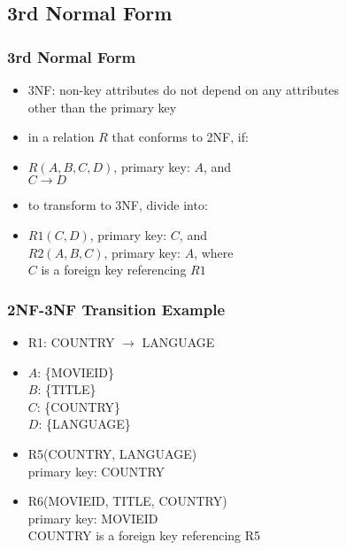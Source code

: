 \documentclass[dvipsnames]{beamer}
\begin{document}
\subsection{3rd Normal Form}

\begin{frame}
  \frametitle{3rd Normal Form}

  \begin{itemize}
    \item \alert{3NF}: non-key attributes do not depend on any attributes\\
      other than the primary key

    \pause
    \medskip
    \item in a relation $R$ that conforms to 2NF, if:
    \item $R(A,B,C,D)$, primary key: $A$, and\\
      $C \rightarrow D$

    \medskip
    \item to transform to 3NF, divide into:
    \item $R1(C,D)$, primary key: $C$, and\\
      $R2(A,B,C)$, primary key: $A$, where\\
      $C$ is a foreign key referencing $R1$
  \end{itemize}
\end{frame}

\begin{frame}
  \frametitle{2NF-3NF Transition Example}

  \begin{itemize}
    \item R1: COUNTRY $\rightarrow$ LANGUAGE
    \item $A$: \{MOVIEID\}\\
      $B$: \{TITLE\}\\
      $C$: \{COUNTRY\}\\
      $D$: \{LANGUAGE\}

    \pause
    \medskip
    \item R5(COUNTRY, LANGUAGE)\\
      primary key: COUNTRY

    \item R6(MOVIEID, TITLE, COUNTRY)\\
      primary key: MOVIEID\\
      COUNTRY is a foreign key referencing R5
  \end{itemize}
\end{frame}
\end{document}
